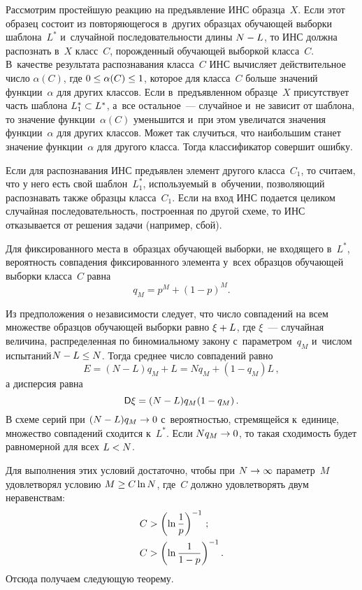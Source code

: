 \begin{multicols}{2}
  Рассмотрим простейшую реакцию на предъявление ИНС образца~$X$. Если 
этот образец состоит из повторяющегося в~других образцах обуча\-ющей выборки 
шаблона~$L^*$ и~случайной последовательности длины $N\hm- L$, то ИНС 
должна распознать в~$X$ класс~$C$, порожденный обуча\-ющей выборкой 
класса~$C$. В~качестве результата распознавания класса~$C$ ИНС вычисляет 
действительное число $\alpha(C)$, где $0\hm\leq \alpha(C)\hm\leq 1$, которое для 
класса~$C$ больше значений функции~$\alpha$ для других классов. Если 
в~предъявленном образце~$X$ присутствует часть шаблона $L_1^*\hm\subset L^*$, 
а~все остальное~--- случайное и~не зависит от шаблона, то значение 
функции~$\alpha(C)$ уменьшится и~при этом увеличатся значения 
функции~$\alpha$ для других классов. Может так случиться, что наибольшим 
станет значение функции~$\alpha$ для другого класса. Тогда классификатор 
совершит ошибку.
  
  Если для распознавания ИНС предъявлен элемент другого класса~$C_1$, то 
считаем, что у него есть свой шаблон~$L_1^*$, используемый в~обуче\-нии, 
поз\-во\-ля\-ющий распознавать также образцы класса~$C_1$. Если на вход ИНС 
подается целиком случайная последовательность, построенная по другой схеме, 
то ИНС отказывается от решения задачи (например, сбой).
  
  Для фиксированного места в~образцах обуча\-ющей выборки, не входящего 
в~$L^*$, вероятность совпадения фиксированного элемента у~всех образцов 
обуча\-ющей выборки класса~$C$ равна
  $$
  q_M= p^M +(1-p)^M.
  $$
   
  Из предположения о независимости следует, что число совпадений на всем 
множестве образцов обуча\-ющей выборки рав\-но $\xi\hm+L$, где $\xi$~--- 
случайная величина, распределенная по биномиальному закону 
с~па\-ра\-мет\-ром~$q_M$ и~чис\-лом испытаний\linebreak $N\hm- L\hm\leq N$.
  Тогда среднее число совпадений равно
  $$
  E=(N-L)q_M +L =Nq_M+(1-q_M)L\,,
  $$
а дисперсия равна
$$
  {\sf D}\xi = (N-L) q_M (1-q_M)\,.
  $$
  В схеме серий при $(N\hm- L)q_M\hm\to 0$ с~ве\-ро\-ят\-ностью, стремящейся 
  к~единице, множество совпадений сходится к~$L^*$. Если $Nq_M\hm\to 0$, то 
такая сходимость будет равномерной для всех $L\hm<N$.
  
  Для выполнения этих условий достаточно, чтобы при $N\hm\to \infty$ 
параметр~$M$ удовлетворял условию $M\hm\geq C\ln N$, где~$C$ должно 
удовлетворять двум неравенствам:
  \begin{align}
  C&>\left( \ln \displaystyle\frac{\displaystyle 1\mathstrut}{\displaystyle p\mathstrut}\right)^{-1}\,;
  \label{e1-gru}
\\
C&> \left( \ln \displaystyle\frac{\displaystyle 1\mathstrut}{\displaystyle 1-p\mathstrut}\right)^{-1}.
\label{e2-gru}
\end{align}
  Отсюда получаем следующую тео\-рему.
  

\end{multicols}
